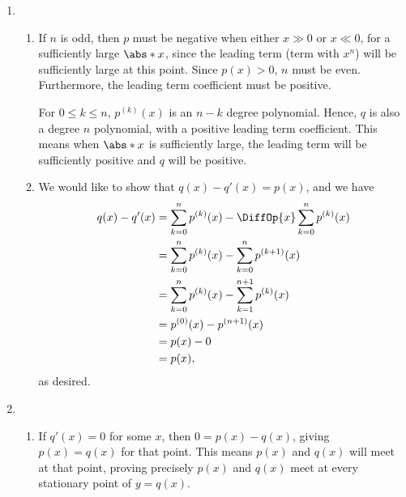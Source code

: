 \Question{\currfilebase}

\begin{enumerate}
    \item \begin{enumerate}
              \item If \(n\) is odd, then \(p\) must be negative when either \(x \gg 0\) or \(x \ll 0\), for a sufficiently large \(\abs*{x}\), since the leading term (term with \(x^n\)) will be sufficiently large at this point. Since \(p(x) > 0\), \(n\) must be even. Furthermore, the leading term coefficient must be positive.

                    For \(0 \leq k \leq n\), \(p^{(k)} (x)\) is an \(n - k\) degree polynomial. Hence, \(q\) is also a degree \(n\) polynomial, with a positive leading term coefficient. This means when \(\abs*{x}\) is sufficiently large, the leading term will be sufficiently positive and \(q\) will be positive.

              \item We would like to show that \(q(x) - q'(x) = p(x)\), and we have
                    \begin{align*}
                        q(x) - q'(x) & = \sum_{k = 0}^{n} p^{(k)} (x) - \DiffOp{x} \sum_{k = 0}^{n} p^{(k)} (x) \\
                                     & = \sum_{k = 0}^{n} p^{(k)} (x) - \sum_{k = 0}^{n} p^{(k + 1)} (x)        \\
                                     & = \sum_{k = 0}^{n} p^{(k)} (x) - \sum_{k = 1}^{n + 1} p^{(k)} (x)        \\
                                     & = p^{(0)} (x) - p^{(n + 1)} (x)                                          \\
                                     & = p(x) - 0                                                               \\
                                     & = p(x),
                    \end{align*}
                    as desired.
          \end{enumerate}

    \item \begin{enumerate}
              \item If \(q'(x) = 0\) for some \(x\), then \(0 = p(x) - q(x)\), giving \(p(x) = q(x)\) for that point. This means \(p(x)\) and \(q(x)\) will meet at that point, proving precisely \(p(x)\) and \(q(x)\) meet at every stationary point of \(y = q(x)\).


\end{enumerate}
\end{enumerate}

